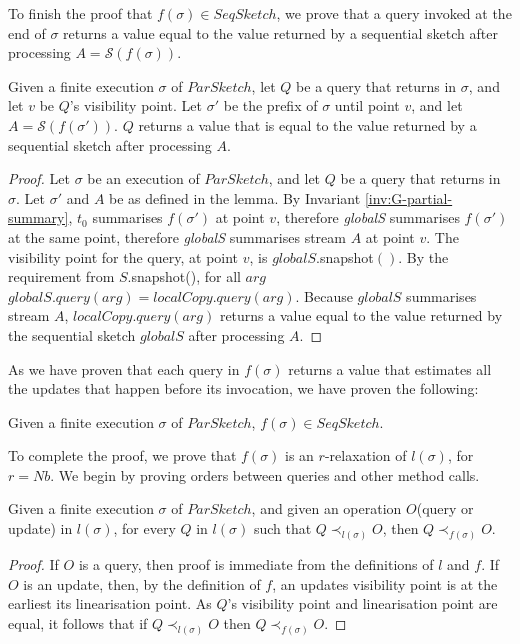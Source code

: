 To finish the proof that $f(\sigma) \in SeqSketch$, we prove that a query invoked at the end of $\sigma$
returns a value equal to the value returned by a sequential sketch after processing $A={\mathcal{S}}(f(\sigma))$.
\begin{lemma}
    Given a finite execution $\sigma$ of $ParSketch$, let $Q$ be a query that returns
    in $\sigma$, and let $v$ be $Q$'s visibility point. Let $\sigma'$ be the prefix
    of $\sigma$ until point $v$, and let $A={\mathcal{S}}(f(\sigma'))$. $Q$ returns a value
    that is equal to the value returned by a sequential sketch after processing $A$.
    \label{lemma:query-correctness}
\end{lemma}
\begin{proof}
    Let $\sigma$ be an execution of $ParSketch$, and let $Q$ be a query that returns in $\sigma$.
    Let $\sigma'$ and $A$ be as defined in the lemma. By Invariant \ref{inv:G-partial-summary}, 
    $t_0$ summarises $f(\sigma')$ at point $v$, therefore \emph{globalS} 
    summarises $f(\sigma')$ at the same point, therefore \emph{globalS} summarises 
    stream $A$ at point $v$. The visibility point for the query, at point $v$,
    is $globalS.$snapshot$()$. By the requirement from $S$.snapshot(), for all $arg$ 
    $globalS.query(arg)=localCopy.query(arg)$. Because $globalS$ summarises
    stream $A$, $localCopy.query(arg)$ returns a value equal to the value
    returned by the sequential sketch $globalS$ after processing $A$.
\end{proof}

As we have proven that each query in $f(\sigma)$ returns a value that estimates all
the updates that happen before its invocation, we have proven the following:
\begin{lemma}
    Given a finite execution $\sigma$ of $ParSketch$, $f(\sigma) \in SeqSketch$.
    \label{lemma:f-in-seqsketch}
\end{lemma}

To complete the proof, we prove that $f(\sigma)$ is an $r$-relaxation of $l(\sigma)$, for $r=Nb$.
We begin by proving orders between queries and other method calls.
\begin{lemma}
    Given a finite execution $\sigma$ of $ParSketch$, and given an operation $O$(query or update) in $l(\sigma)$,
    for every $Q$ in $l(\sigma)$ such that $Q \prec_{l(\sigma)} O$,
    then $Q \prec_{f(\sigma)} O$.
    \label{lemma:QueryOrders}
\end{lemma}
\begin{proof}
    If $O$ is a query,
    then proof is immediate from the definitions of $l$ and $f$.
    If $O$ is an update, then, by the definition of $f$, an updates visibility point
    is at the earliest its linearisation point.
    As $Q$'s visibility point and linearisation point are equal, it follows
    that if  $Q \prec_{l(\sigma)} O$ then $Q \prec_{f(\sigma)} O$.
\end{proof}

